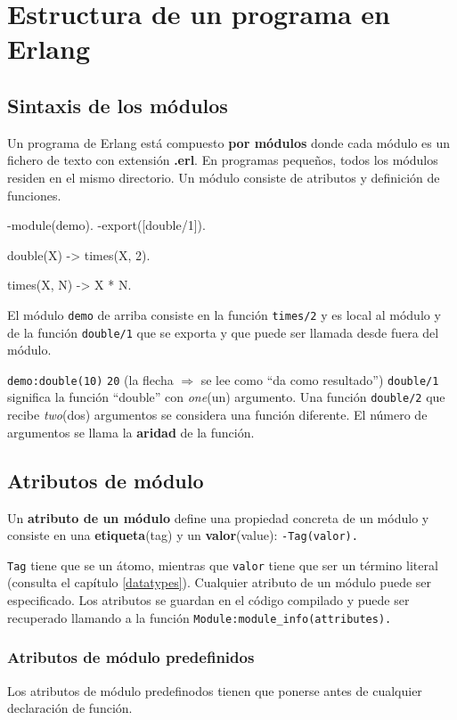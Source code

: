 \chapter{Estructura de un programa en Erlang}

\section{Sintaxis de los m\'odulos}

Un programa de Erlang est\'a compuesto \textbf{por m\'odulos} donde cada m\'odulo
es un fichero de texto con extensi\'on \textbf{.erl}. En programas peque\~nos, todos
los m\'odulos residen en el mismo directorio. Un m\'odulo consiste de atributos y 
definici\'on de funciones.

\begin{erlang}
-module(demo).
-export([double/1]).

double(X) -> times(X, 2).

times(X, N) -> X * N.
\end{erlang}

El m\'odulo \texttt{demo} de arriba consiste en la funci\'on \texttt{times/2}
y es local al m\'odulo y de la funci\'on \texttt{double/1} que se exporta
y que puede ser llamada desde fuera del m\'odulo.

\texttt{demo:double(10)} \resultingin \texttt{20}\hfill
(la flecha $\Rightarrow$ se lee como ``da como resultado'') \texttt{double/1} significa la funci\'on ``double'' con \textit{one}(un)
argumento. Una funci\'on \texttt{double/2} que recibe \textit{two}(dos) argumentos se considera una funci\'on diferente. El n\'umero de argumentos se llama la \textbf{aridad} de la funci\'on.

\section{Atributos de m\'odulo}
Un \textbf{atributo de un m\'odulo} define una propiedad concreta de un m\'odulo y consiste en una \textbf{etiqueta}(tag) y un \textbf{valor}(value):
\texttt{-Tag(valor).} 

\texttt{Tag} tiene que se un \'atomo, mientras que \texttt{valor} tiene que ser un t\'ermino literal (consulta el cap\'itulo \ref{datatypes}). Cualquier atributo de un m\'odulo puede ser especificado. Los atributos se guardan en el c\'odigo compilado y puede ser recuperado llamando a la funci\'on \texttt{Module:module\_info(attributes).}

\subsection{Atributos de m\'odulo predefinidos}
Los atributos de m\'odulo predefinodos tienen que ponerse antes de cualquier declaraci\'on de funci\'on.

